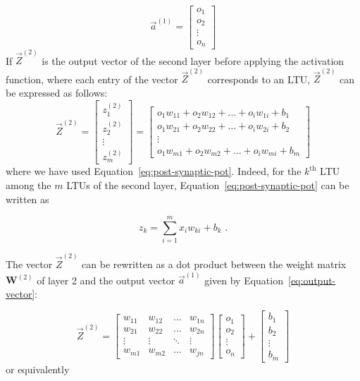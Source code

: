 \begin{equation}
\label{eq:output-vector}
\Vec{a}^{(1)} =
\begin{bmatrix}
o_1 \\
o_2 \\
\vdots \\
o_n
\end{bmatrix}
\end{equation}
If $\Vec{Z}^{(2)}$ is the output vector of the second layer before applying the activation function, where each entry of the vector $\Vec{Z}^{(2)}$ corresponds to an LTU, $\Vec{Z}^{(2)}$ can be expressed as follows:
\begin{equation}
\label{eq:ouput-layer}
 \Vec{Z}^{(2)} =
\begin{bmatrix}
z_1^{(2)} \\
z_2^{(2)} \\
\vdots \\
z_m^{(2)}
\end{bmatrix}
=
\begin{bmatrix}
o_1w_{11} + o_2w_{12} + \dots +o_i w_{1i} + b_1\\
o_1w_{21} + o_2w_{22} + \dots +o_i w_{2i} + b_2\\
\vdots \\
o_1w_{m1} + o_2w_{m2} + \dots +o_i w_{mi} + b_m
\end{bmatrix}
\end{equation}
where we have used Equation~\eqref{eq:post-synaptic-pot}. Indeed, for the $k^{\text{th}}$ LTU among the $m$ LTUs of the second layer, Equation~\eqref{eq:post-synaptic-pot} can be written as

\begin{equation*}
z_k = \sum_{i=1}^{m} x_i w_{ki} + b_k \text{ .}
\end{equation*}

The vector $\Vec{Z}^{(2)}$ can be rewritten as a dot product between the weight matrix $\mathbf{W}^{(2)}$ of layer 2 and the output vector $\Vec{a}^{(1)}$ given by Equation~\eqref{eq:output-vector}:

\begin{equation}
\label{eq:one-layer-output-detail}
\Vec{Z}^{(2)} =
\begin{bmatrix}
    w_{11} & w_{12} & \dots & w_{1n} \\
    w_{21} & w_{22} & \dots & w_{2n} \\
    \vdots & \vdots & \ddots & \vdots \\
    w_{m1} & w_{m2} & \dots & w_{jn}
\end{bmatrix}
\begin{bmatrix}
    o_1 \\
    o_2 \\
    \vdots \\
    o_n
\end{bmatrix}
+
\begin{bmatrix}
    b_1 \\
    b_2 \\
    \vdots \\
    b_m
\end{bmatrix}
\end{equation}
or equivalently

